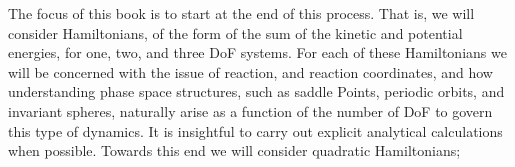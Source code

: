 \documentclass{article}
\begin{document}
The focus of this book is to start at the end of this process. That is, we will consider Hamiltonians, of the form of the sum of the kinetic and potential energies, for one, two, and three DoF systems. For each of these Hamiltonians we will be concerned with  the issue of reaction, and reaction coordinates, and how understanding phase space structures, such as
saddle Points, periodic orbits, and invariant spheres, naturally arise as a function of the number of DoF to govern this type of dynamics. It is insightful to carry out explicit analytical calculations when possible. Towards this end we will consider quadratic Hamiltonians;







\end{document}
